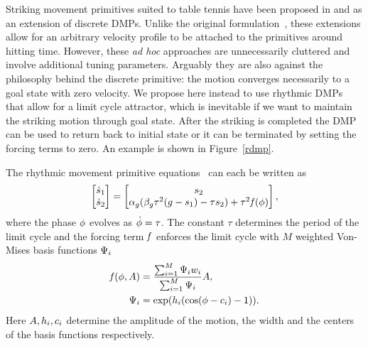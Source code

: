 Striking movement primitives suited to table tennis have been proposed in \cite{Kober10} and \cite{Muelling13} as an extension of discrete DMPs. Unlike the original formulation~\cite{Ijspeert02}, these extensions allow for an arbitrary velocity profile to be attached to the primitives around hitting time. However, these \emph{ad hoc} approaches are unnecessarily cluttered and involve additional tuning parameters. Arguably they are also against the philosophy behind the discrete primitive: the motion converges necessarily to a goal state with zero velocity. We propose here instead to use rhythmic DMPs that allow for a limit cycle attractor, which is inevitable if we want to maintain the striking motion through goal state. After the striking is completed the DMP can be used to return back to initial state or it can be terminated by setting the forcing terms to zero. An example is shown in Figure~\ref{rdmp}.

The rhythmic movement primitive equations~\cite{Kober08} can each be written as
%
\begin{equation}
\begin{aligned}
\begin{bmatrix}
   \dot{s}_1 \\
   \dot{s}_2
 \end{bmatrix} = \begin{bmatrix}
     s_2  \\
     \alpha_{g} (\beta_{g}\tau^2(g - s_1) - \tau s_2) +  \tau^2\mathit{f}(\phi)
  \end{bmatrix}
\label{dmp},
\end{aligned}
\end{equation}
%
\noindent where the phase $\phi$ evolves as $\dot{\phi} = \tau$. The constant $\tau$ determines the period of the limit cycle and the forcing term $\mathit{f}$ enforces the limit cycle with $M$ weighted Von-Mises basis functions $\Psi_i$
%
\begin{equation}
\begin{aligned}
\mathit{f}(\phi,A) &= \frac{\sum_{i=1}^{M}\Psi_i w_i}{\sum_{i=1}^{M}\Psi_i}A, \\
\Psi_i &= \exp(h_i (\cos(\phi - c_i) - 1)).
\label{forcing}
\end{aligned}
\end{equation}
%
\noindent Here $A, h_i, c_i$ determine the amplitude of the motion, the width and the centers of the basis functions respectively.

